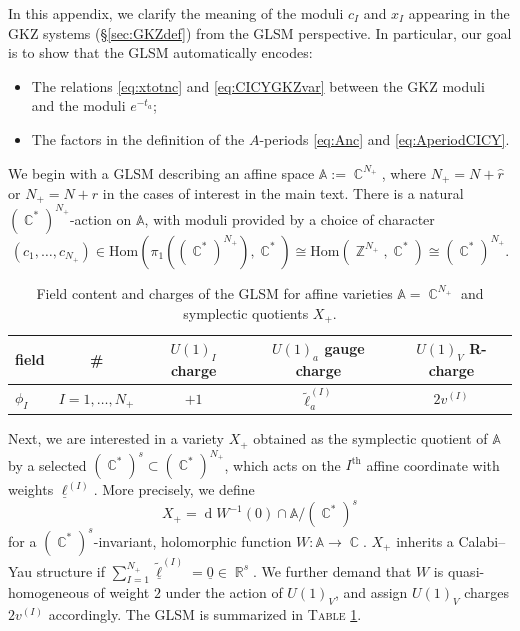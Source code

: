 \documentclass[12pt,a4paper,oneside]{amsart}
\numberwithin{equation}{section}
\theoremstyle{definition}
\theoremstyle{remark}
\DeclareMathOperator{\R}{\mathbb{R}}
\DeclareMathOperator{\C}{\mathbb{C}}
\DeclareMathOperator{\Z}{\mathbb{Z}}
\DeclareMathOperator{\dd}{d}
\begin{document}
\begin{appendix}
In this appendix, we clarify the meaning of the moduli $c_I$ and $x_I$ appearing in the GKZ systems (\S\ref{sec:GKZdef}) from the GLSM perspective. In particular, our goal is to show that the GLSM automatically encodes:
\begin{itemize}
    \item The relations \eqref{eq:xtotnc} and \eqref{eq:CICYGKZvar} between the GKZ moduli and the moduli $e^{-t_a}$;
    \item The factors in the definition of the $A$-periods \eqref{eq:Anc} and \eqref{eq:AperiodCICY}.
\end{itemize}\par
We begin with a GLSM describing an affine space $\mathbb{A}:=\C^{N_+}$, where $N_+=N+\hat{r}$ or $N_+=N+r$ in the cases of interest in the main text. There is a natural $(\C^{\ast})^{N_+}$-action on $\mathbb{A}$, with moduli provided by a choice of character 
\begin{equation*}
    (c_{1}, \dots, c_{N_{+}} ) \in \mathrm{Hom} \left( \pi_1 \left( (\C^{\ast})^{N_+} \right), \C^{\ast} \right) \cong  \mathrm{Hom} \left( \Z^{N_+},\C^{\ast} \right) \cong  (\C^{\ast})^{N_+} .
\end{equation*}\par
\begin{table}[th]
\centering
\begin{tabular}{l |c |c | c |c}
	field & \# & $U(1)_I$ charge & $U(1)_a$ gauge charge & $U(1)_V$ R-charge\\
	\hline
	$\phi_I$ & $I=1, \dots, N_+$ & $+1$ & $\tilde{\ell}_a ^{(I)}$ & $2v^{(I)}$\\
	\hline
\end{tabular}
\caption{Field content and charges of the GLSM for affine varieties $\mathbb{A}=\C^{N_+}$ and symplectic quotients $X_+$.}
\label{tab:GLSMaffine}
\end{table}\par
Next, we are interested in a variety $X_{+}$ obtained as the symplectic quotient of $\mathbb{A}$ by a selected $(\C^{\ast})^{s} \subset (\C^{\ast})^{N_+}$, which acts on the $I^{\text{th}}$ affine coordinate with weights $\underline{\ell}^{(I)}$.
More precisely, we define 
\begin{equation*}
    X_+ = \dd W^{-1} (0) \cap \mathbb{A} / (\C^{\ast})^{s} 
\end{equation*}
for a $(\C^{\ast})^{s}$-invariant, holomorphic function $W : \mathbb{A} \longrightarrow \C$. $X_+$ inherits a Calabi--Yau structure if $\sum_{I=1}^{N_+}\tilde{\underline{\ell}}^{(I)} = \underline{0}\in \R^s$. We further demand that $W$ is quasi-homogeneous of weight $2$ under the action of $U(1)_V$, and assign $U(1)_V$ charges $2 v^{(I)}$ accordingly. The GLSM is summarized in \textsc{Table} \ref{tab:GLSMaffine}.\par

\end{appendix}
\end{document}
